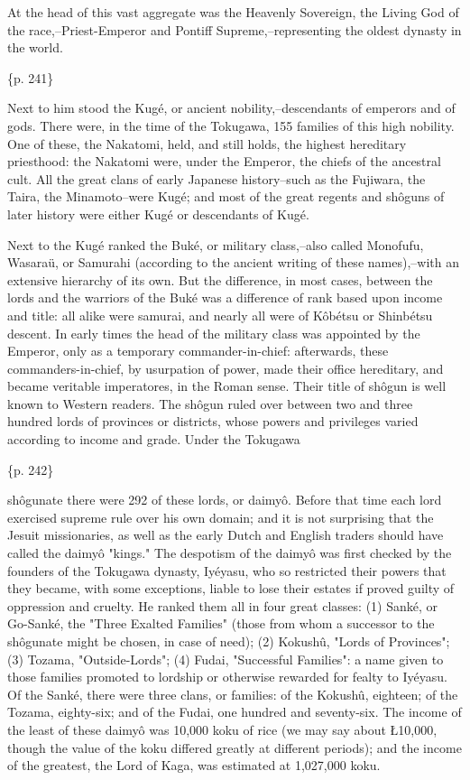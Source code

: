 At the head of this vast aggregate was the Heavenly Sovereign, the Living God of the race,--Priest-Emperor and Pontiff Supreme,--representing the oldest dynasty in the world.

\{p. 241\}

Next to him stood the Kugé, or ancient nobility,--descendants of emperors and of gods. There were, in the time of the Tokugawa, 155 families of this high nobility. One of these, the Nakatomi, held, and still holds, the highest hereditary priesthood: the Nakatomi were, under the Emperor, the chiefs of the ancestral cult. All the great clans of early Japanese history--such as the Fujiwara, the Taira, the Minamoto--were Kugé; and most of the great regents and shôguns of later history were either Kugé or descendants of Kugé.

Next to the Kugé ranked the Buké, or military class,--also called Monofufu, Wasaraü, or Samurahi (according to the ancient writing of these names),--with an extensive hierarchy of its own. But the difference, in most cases, between the lords and the warriors of the Buké was a difference of rank based upon income and title: all alike were samurai, and nearly all were of Kôbétsu or Shinbétsu descent. In early times the head of the military class was appointed by the Emperor, only as a temporary commander-in-chief: afterwards, these commanders-in-chief, by usurpation of power, made their office hereditary, and became veritable imperatores, in the Roman sense. Their title of shôgun is well known to Western readers. The shôgun ruled over between two and three hundred lords of provinces or districts, whose powers and privileges varied according to income and grade. Under the Tokugawa

\{p. 242\}

shôgunate there were 292 of these lords, or daimyô. Before that time each lord exercised supreme rule over his own domain; and it is not surprising that the Jesuit missionaries, as well as the early Dutch and English traders should have called the daimyô "kings." The despotism of the daimyô was first checked by the founders of the Tokugawa dynasty, Iyéyasu, who so restricted their powers that they became, with some exceptions, liable to lose their estates if proved guilty of oppression and cruelty. He ranked them all in four great classes: (1) Sanké, or Go-Sanké, the "Three Exalted Families" (those from whom a successor to the shôgunate might be chosen, in case of need); (2) Kokushû, "Lords of Provinces"; (3) Tozama, "Outside-Lords"; (4) Fudai, "Successful Families": a name given to those families promoted to lordship or otherwise rewarded for fealty to Iyéyasu. Of the Sanké, there were three clans, or families: of the Kokushû, eighteen; of the Tozama, eighty-six; and of the Fudai, one hundred and seventy-six. The income of the least of these daimyô was 10,000 koku of rice (we may say about Ł10,000, though the value of the koku differed greatly at different periods); and the income of the greatest, the Lord of Kaga, was estimated at 1,027,000 koku.

